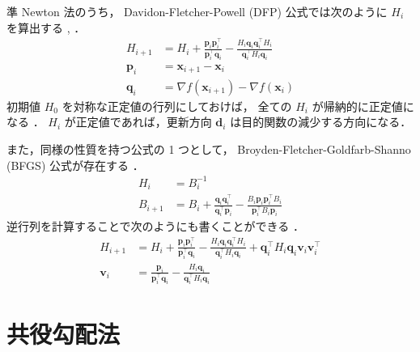 準 Newton 法のうち，
Davidon-Fletcher-Powell (DFP) 公式では次のように $H_i$ を算出する
\cite[Section 9.3]{Luenberger2003}, \cite[Section 10.9]{Press2007}．
\begin{align}
    H_{i+1}  & = H_i + \frac{\bm{p}_i \bm{p}_i^\top}{\bm{p}_i^\top \bm{q}_i}
    - \frac{H_i \bm{q}_i \bm{q}_i^\top H_i}{\bm{q}_i^\top H_i \bm{q}_i}      \\
    \bm{p}_i & = \bm{x}_{i+1} - \bm{x}_i                                     \\
    \bm{q}_i & = \nabla f(\bm{x}_{i+1}) - \nabla f(\bm{x}_i)
\end{align}
初期値 $H_0$ を対称な正定値の行列にしておけば，
全ての $H_i$ が帰納的に正定値になる
\cite[Section 9.3]{Luenberger2003}．
$H_i$ が正定値であれば，更新方向 $\bm{d}_i$ は目的関数の減少する方向になる．

また，同様の性質を持つ公式の 1 つとして，
Broyden-Fletcher-Goldfarb-Shanno (BFGS) 公式が存在する
\cite[Section 9.4]{Luenberger2003}．
\begin{align}
    H_i     & = B_i^{-1}                                                    \\
    B_{i+1} & = B_i + \frac{\bm{q}_i \bm{q}_i^\top}{\bm{q}_i^\top \bm{p}_i}
    - \frac{B_i \bm{p}_i \bm{p}_i^\top B_i}{\bm{p}_i^\top B_i \bm{p}_i}
\end{align}
逆行列を計算することで次のようにも書くことができる
\cite[Section 10.9]{Press2007}．
\begin{align}
    H_{i+1}  & = H_i + \frac{\bm{p}_i \bm{p}_i^\top}{\bm{p}_i^\top \bm{q}_i}
    - \frac{H_i \bm{q}_i \bm{q}_i^\top H_i}{\bm{q}_i^\top H_i \bm{q}_i}
    + \bm{q}_i^\top H_i \bm{q}_i \bm{v}_i \bm{v}_i^\top                      \\
    \bm{v}_i & = \frac{\bm{p}_i}{\bm{p}_i^\top \bm{q}_i}
    - \frac{H_i \bm{q}_i}{\bm{q}_i^\top H_i \bm{q}_i}
\end{align}

\section{共役勾配法}

